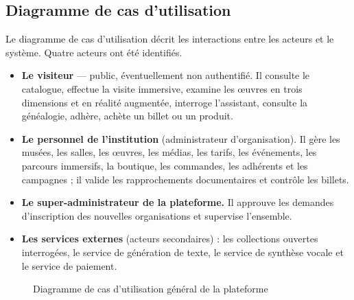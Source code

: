\subsection{Diagramme de cas d'utilisation}

Le diagramme de cas d'utilisation décrit les interactions entre les acteurs et
le système. Quatre acteurs ont été identifiés.

\begin{itemize}
  \item \textbf{Le visiteur} — public, éventuellement non authentifié. Il
        consulte le catalogue, effectue la visite immersive, examine les œuvres
        en trois dimensions et en réalité augmentée, interroge l'assistant,
        consulte la généalogie, adhère, achète un billet ou un produit.

  \item \textbf{Le personnel de l'institution} (administrateur d'organisation).
        Il gère les musées, les salles, les œuvres, les médias, les tarifs, les
        événements, les parcours immersifs, la boutique, les commandes, les
        adhérents et les campagnes ; il valide les rapprochements documentaires
        et contrôle les billets.

  \item \textbf{Le super-administrateur de la plateforme.} Il approuve les
        demandes d'inscription des nouvelles organisations et supervise
        l'ensemble.

  \item \textbf{Les services externes} (acteurs secondaires) : les collections
        ouvertes interrogées, le service de génération de texte, le service de
        synthèse vocale et le service de paiement.
\end{itemize}

\begin{figure}[htbp]
\centering
{}
\caption{Diagramme de cas d'utilisation général de la plateforme}
\label{fig:usecase}
\end{figure}


